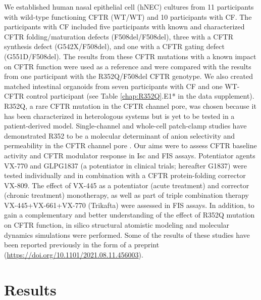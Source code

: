 We established human nasal epithelial cell (hNEC) cultures from 11 participants with wild-type functioning CFTR (WT/WT) and 10 participants with CF. The participants with CF included five participants with known and characterized CFTR folding/maturation defects (F508del/F508del), three with a CFTR synthesis defect (G542X/F508del), and one with a CFTR gating defect (G551D/F508del). The results from these CFTR mutations with a known impact on CFTR function were used as a reference and were compared with the results from one participant with the R352Q/F508del CFTR genotype. We also created matched intestinal organoids from seven participants with CF and one WT-CFTR control participant (see Table \ref{chap:R352Q}.E1* in the data supplement). R352Q, a rare CFTR mutation in the CFTR channel pore, was chosen because it has been characterized in heterologous systems but is yet to be tested in a patient-derived model. Single-channel and whole-cell patch-clamp studies have demonstrated R352 to be a molecular determinant of anion selectivity and permeability in the CFTR channel pore \cite{guinamard1999}. Our aims were to assess CFTR baseline activity and CFTR modulator response in Isc and FIS assays. Potentiator agents VX-770 and GLPG1837 (a potentiator in clinical trials; hereafter G1837) were tested individually and in combination with a CFTR protein-folding corrector VX-809. The effect of VX-445 as a potentiator (acute treatment) and corrector (chronic treatment) monotherapy, as well as part of triple combination therapy VX-445+VX-661+VX-770 (Trikafta) were assessed in FIS assays. In addition, to gain a complementary and better understanding of the effect of R352Q mutation on CFTR function, in silico structural atomistic modeling and molecular dynamics simulations were performed. Some of the results of these studies have been reported previously in the form of a preprint (\href{https://doi.org/10.1101/2021.08.11.456003}{https://doi.org/10.1101/2021.08.11.456003}).


\section{Results}

